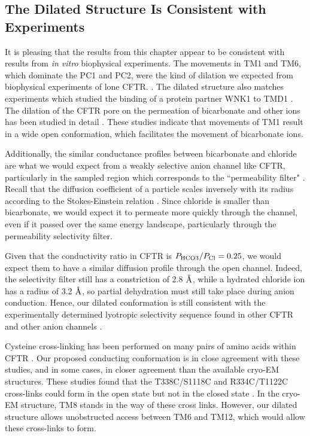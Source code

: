 \subsection{The Dilated Structure Is Consistent with Experiments}
It is pleasing that the results from this chapter appear to be consistent with results from \textit{in vitro} biophysical experiments. The movements in TM1 and TM6, which dominate the PC1 and PC2, were the kind of dilation we expected from biophysical experiments of lone CFTR. \cite{negoda2019,linsdell2016}. The dilated structure also matches experiments which studied the binding of a protein partner WNK1 to TMD1 \cite{kim2019}. The dilation of the CFTR pore on the permeation of bicarbonate and other ions has been studied in detail \cite{jun2016, kim2019}. These studies indicate that movements of TM1 result in a wide open conformation, which facilitates the movement of bicarbonate ions.  

Additionally, the similar conductance profiles between bicarbonate and chloride are what we would expect from a weakly selective anion channel like CFTR, particularly in the sampled region which corresponds to the ``permeability filter" \cite{linsdell2016}. Recall that the diffusion coefficient of a particle scales inversely with its radius according to the Stokes-Einstein relation \cite{miller1924}. Since chloride is smaller than bicarbonate, we would expect it to permeate more quickly through the channel, even if it passed over the same energy landscape, particularly through the permeability selectivity filter. 

Given that the conductivity ratio in CFTR is $P_{\rm{HCO3}}/P_{\rm{Cl}}=0.25$, we would expect them to have a similar diffusion profile through the open channel. Indeed, the selectivity filter still has a constriction of 2.8 $\textup{\AA}$, while a hydrated chloride ion has a radius of 3.2 $\textup{\AA}$, so partial dehydration must still take place during anion conduction. Hence, our dilated conformation is still consistent with the experimentally determined lyotropic selectivity sequence found in other CFTR and other anion channels \cite{linsdell2016}. 

Cysteine cross-linking has been performed on many pairs of amino acids within CFTR \cite{negoda2019, cui2008, negoda2018, wang2012}. Our proposed conducting conformation is in close agreement with these studies, and in some cases, in closer agreement than the available cryo-EM structures. These studies found that the T338C/S1118C and R334C/T1122C cross-links could form in the open state but not in the closed state \cite{wang2012}. In the cryo-EM structure, TM8 stands in the way of these cross links. However, our dilated structure allows unobstructed access between TM6 and TM12, which would allow these cross-links to form. 

